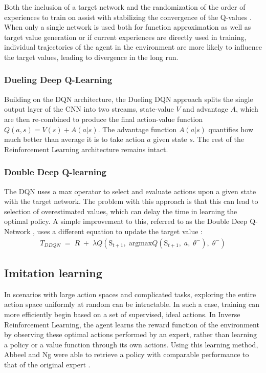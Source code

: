 \documentclass[10pt,journal,compsoc]{IEEEtran}
\begin{document}
Both the inclusion of a target network and the randomization of the order of experiences to train on assist with stabilizing the convergence of the Q-values \cite{deepqlearning}. When only a single network is used both for function approximation as well as target value generation or if current experiences are directly used in training, individual trajectories of the agent in the environment are more likely to influence the target values, leading to divergence in the long run.

\subsubsection{Dueling Deep Q-Learning}
Building on the DQN architecture, the Dueling DQN approach \cite{wang2015dueling} splits the single output layer of the CNN into two streams, state-value $V$ and advantage $A$, which are then re-combined to produce the final action-value function $Q(a,s) = V(s) + A(a | s)$. The advantage function $A(a | s)$ quantifies how much better than average it is to take action $a$ given state $s$. The rest of the Reinforcement Learning architecture remains intact.

\subsubsection{Double Deep Q-learning}
The DQN uses a max operator to select and evaluate actions upon a given state with the target network. The problem with this approach is that this can lead to selection of overestimated values, which can delay the time in learning the optimal policy. A simple improvement to this, referred to as the Double Deep Q-Network \cite{doubledeepqlearning}, uses a different equation to update the target value :
\begin{align*}
T_{DDQN}\; =\; R\; +\; \lambda Q\left( \mbox{S}_{t+1},\; \mbox{argmax}Q\left( \mbox{S}_{t+1},\; a,\; \theta ^{-} \right),\; \theta ^{-} \right)
\end{align*}
\subsection{Imitation learning}
In scenarios with large action spaces and complicated tasks, exploring the entire action space uniformly at random can be intractable. In such a case, training can more efficiently begin based on a set of supervised, ideal actions. In Inverse Reinforcement Learning, the agent learns the reward function of the environment by observing these optimal actions performed by an expert, rather than learning a policy or a value function through its own actions. Using this learning method, Abbeel and Ng were able to retrieve a policy with comparable performance to that of the original expert \cite{abbeel2004apprenticeship}.
\end{document}
